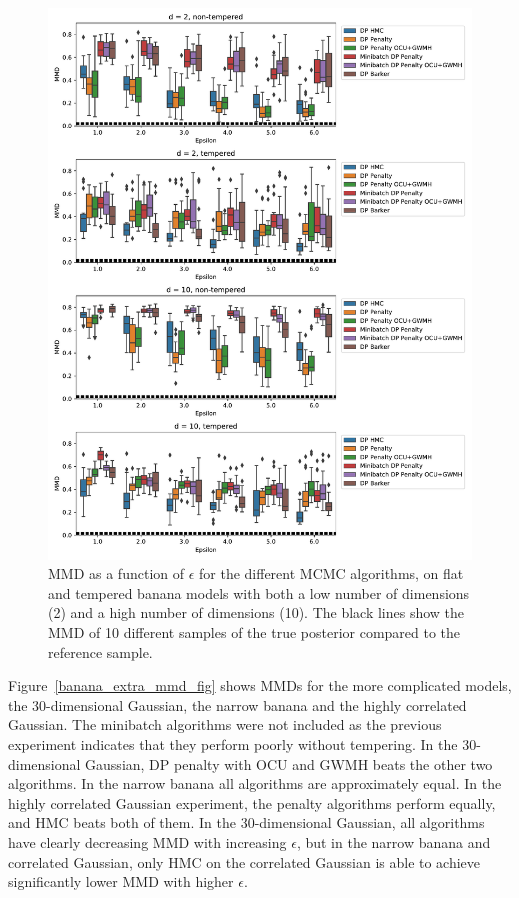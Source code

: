 \documentclass[english,twoside,openright]{HYgraduMLDS}
\begin{document}
\begin{figure}
  \centering
  \includegraphics[width=\textwidth]{figures/banana_mmd.pdf}
  \caption{
    MMD as a function of \(\epsilon\) for the different MCMC algorithms,
    on flat and tempered banana models with both a low number of dimensions (2)
    and a high number of dimensions (10). The black lines show the MMD of 10
    different samples of the true posterior compared to the reference sample.
  }
  \label{banana_mmd_fig}

\end{figure}

Figure~\ref{banana_extra_mmd_fig} shows MMDs for the more complicated models,
the 30-dimensional Gaussian, the narrow banana and the highly correlated Gaussian.
The minibatch algorithms were not included as the previous experiment indicates
that they perform poorly without tempering.
In the 30-dimensional Gaussian, DP penalty with OCU and GWMH beats the other
two algorithms. In the narrow
banana all algorithms are approximately equal. In the highly correlated
Gaussian experiment, the penalty algorithms perform equally, and HMC beats
both of them. In the 30-dimensional Gaussian, all algorithms have clearly
decreasing MMD with increasing \(\epsilon\), but in the narrow banana and
correlated Gaussian, only HMC on the correlated Gaussian is able to achieve
significantly lower MMD with higher \(\epsilon\).
\end{document}
